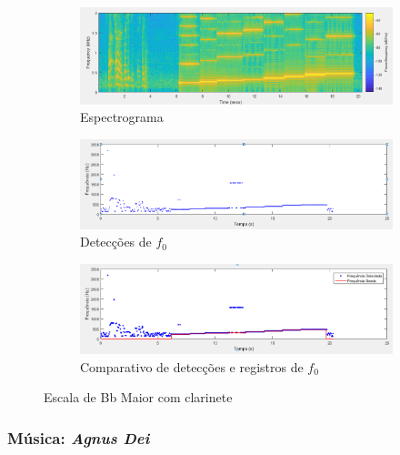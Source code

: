 \begin{figure}

\begin{subfigure}{1\textwidth}
	\includegraphics[width=\linewidth]{pasta1_figuras/clarinete-escala-2.png}
	\caption{Espectrograma}
	\label{fig-clarinete-escala-2}
\end{subfigure}
	\hspace*{\fill} %
\begin{subfigure}{1\textwidth}
	\includegraphics[width=\linewidth]{pasta1_figuras/clarinete-escala-3.png}
	\caption{Detecções de $f_0$}
	\label{fig-clarinete-escala-3}
\end{subfigure}
	\hspace*{\fill} %
\begin{subfigure}{1\textwidth}
	\includegraphics[width=\linewidth]{pasta1_figuras/clarinete-escala-4.png}
	\caption{Comparativo de detecções e registros de $f_0$}
	\label{fig-clarinete-escala-4}
\end{subfigure}
	\caption{Escala de Bb Maior com clarinete}
\end{figure}

\subsubsection{Música: \textit{Agnus Dei}}

